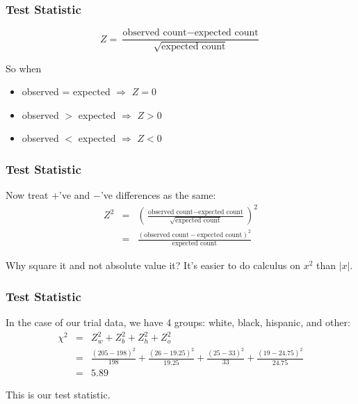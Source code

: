 \documentclass[handout]{beamer}
\newcommand{\blue}[1]{\textcolor{blue2}{#1}}
\begin{document}
\begin{frame}[fragile]
\frametitle{Test Statistic}
\[
Z = \frac{\mbox{observed count} - \mbox{expected count}}{\sqrt{\mbox{expected count}}}
\]

So when 
\begin{itemize}
\item observed = expected $\Rightarrow$ $Z=0$
\item observed $>$ expected $\Rightarrow$ $Z>0$
\item observed $<$ expected $\Rightarrow$ $Z<0$
\end{itemize}

\end{frame}


\begin{frame}[fragile]
\frametitle{Test Statistic}
Now treat $+$'ve and $-$'ve differences as the same:
\begin{eqnarray*}
Z^2 &=& \left(\frac{\mbox{observed count} - \mbox{expected count}}{\sqrt{\mbox{expected count}}}\right)^2\\
&=& \frac{(\mbox{observed count} - \mbox{expected count})^2}{\mbox{expected count}}
\end{eqnarray*}

\pause Why square it and not absolute value it?  It's easier to do \blue{calculus} on $x^2$ than $|x|$.
\end{frame}


\begin{frame}[fragile]
\frametitle{Test Statistic}
In the case of our trial data, we have 4 groups: white, black, hispanic, and other:
\begin{eqnarray*}
\chi^2 &=& Z_w^2 + Z_b^2 + Z_h^2 + Z_o^2\\
&=& \frac{(205-198)^2}{198} + \frac{(26-19.25)^2}{19.25} + \frac{(25-33)^2}{33} + \frac{(19-24.75)^2}{24.75}\\
&=& 5.89
\end{eqnarray*}

\pause \blue{This is our test statistic}.
\end{frame}
\end{document}
